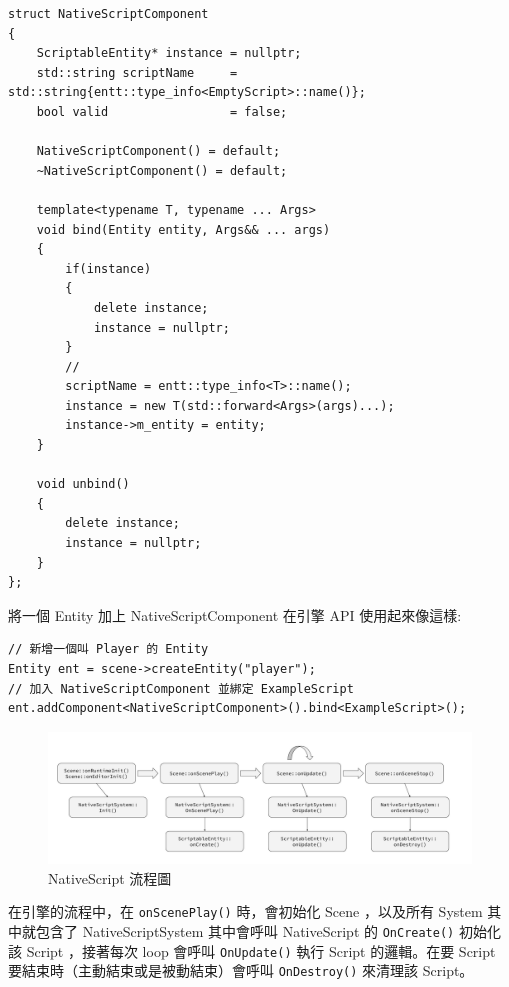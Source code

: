 \begin{lstlisting}
struct NativeScriptComponent
{
    ScriptableEntity* instance = nullptr;
    std::string scriptName     = std::string{entt::type_info<EmptyScript>::name()};
    bool valid                 = false;

    NativeScriptComponent() = default;
    ~NativeScriptComponent() = default;

    template<typename T, typename ... Args>
    void bind(Entity entity, Args&& ... args)
    {
        if(instance)
        {
            delete instance;
            instance = nullptr;
        }
        //
        scriptName = entt::type_info<T>::name();
        instance = new T(std::forward<Args>(args)...);
        instance->m_entity = entity;
    }

    void unbind()
    {
        delete instance;
        instance = nullptr;
    }
};
\end{lstlisting}

將一個 Entity 加上 NativeScriptComponent 在引擎 API 使用起來像這樣:

\begin{lstlisting}
// 新增一個叫 Player 的 Entity
Entity ent = scene->createEntity("player");
// 加入 NativeScriptComponent 並綁定 ExampleScript
ent.addComponent<NativeScriptComponent>().bind<ExampleScript>();
\end{lstlisting}

\begin{figure}[h]
    \begin{center}
    \includegraphics[width=\textwidth]{./resources/scriptable/process.png}
    \end{center}
\caption{NativeScript 流程圖}
\label{fig:RishEngineNativeScript}
\end{figure}

在引擎的流程中，在 \lstinline{onScenePlay()} 時，會初始化 Scene ，以及所有 System 其中就包含了 NativeScriptSystem 其中會呼叫 NativeScript 的 \lstinline{OnCreate()} 初始化該 Script
，接著每次 loop 會呼叫 \lstinline{OnUpdate()} 執行 Script 的邏輯。在要 Script 要結束時（主動結束或是被動結束）會呼叫 \lstinline{OnDestroy()} 來清理該 Script。

